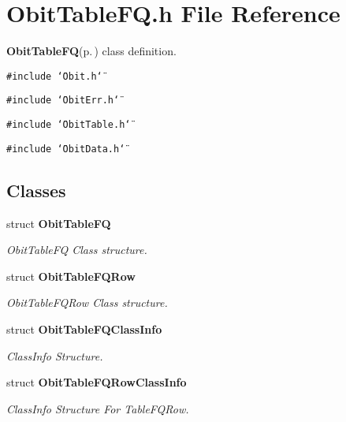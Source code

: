 \section{Obit\-Table\-FQ.h File Reference}
\label{ObitTableFQ_8h}
{\bf Obit\-Table\-FQ}{\rm (p.\,\pageref{structObitTableFQ})} class definition. 

{\tt \#include \char`\"{}Obit.h\char`\"{}}\par
{\tt \#include \char`\"{}Obit\-Err.h\char`\"{}}\par
{\tt \#include \char`\"{}Obit\-Table.h\char`\"{}}\par
{\tt \#include \char`\"{}Obit\-Data.h\char`\"{}}\par
\subsection*{Classes}
\begin{CompactItemize}
\item 
struct {\bf Obit\-Table\-FQ}
\begin{CompactList}\small\item\em Obit\-Table\-FQ Class structure. \item\end{CompactList}\item 
struct {\bf Obit\-Table\-FQRow}
\begin{CompactList}\small\item\em Obit\-Table\-FQRow Class structure. \item\end{CompactList}\item 
struct {\bf Obit\-Table\-FQClass\-Info}
\begin{CompactList}\small\item\em Class\-Info Structure. \item\end{CompactList}\item 
struct {\bf Obit\-Table\-FQRow\-Class\-Info}
\begin{CompactList}\small\item\em Class\-Info Structure For Table\-FQRow. \item\end{CompactList}\end{CompactItemize}
